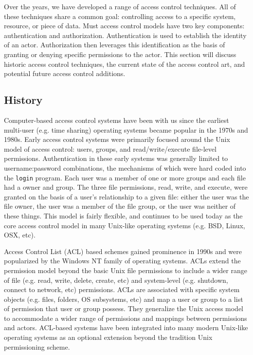 \documentclass{sig-alternate}
\begin{document}
Over the years, we have developed a range of access control
techniques. All of these techniques share a common goal: controlling
access to a specific system, resource, or piece of data. Must access
control models have two key components: authentication and
authorization.  Authentication is used to establish the identity of an
actor. Authorization then leverages this identification as the basis
of granting or denying specific permissions to the actor. This section
will discuss historic access control techniques, the current state of
the access control art, and potential future access control additions.

\subsection{History}

Computer-based access control systems have been with us since the
earliest multi-user (e.g. time sharing) operating systems became
popular in the 1970s and 1980s. Early access control systems were
primarily focused around the Unix model of access control: users,
groups, and read/write/execute file-level permissions. Authentication
in these early systems was generally limited to username:password
combinations, the mechanisms of which were hard coded into the
\texttt{login} program. Each user was a member of one or more groups
and each file had a owner and group. The three file permissions, read,
write, and execute, were granted on the basis of a user's relationship
to a given file: either the user was the file owner, the user was a
member of the file group, or the user was neither of these
things. This model is fairly flexible, and continues to be used today
as the core access control model in many Unix-like operating systems
(e.g. BSD, Linux, OSX, etc).

Access Control List (ACL) based schemes gained prominence in 1990s and
were popularized by the Windows NT family of operating systems. ACLs
extend the permission model beyond the basic Unix file permissions to
include a wider range of file (e.g. read, write, delete, create, etc)
and system-level (e.g. shutdown, connect to network, etc)
permissions. ACLs are associated with specific system objects
(e.g. files, folders, OS subsystems, etc) and map a user or group to a
list of permission that user or group possess. They generalize the
Unix access model to accommodate a wider range of permissions and
mappings between permissions and actors. ACL-based systems have been
integrated into many modern Unix-like operating systems as an optional
extension beyond the tradition Unix permissioning scheme.
\end{document}
